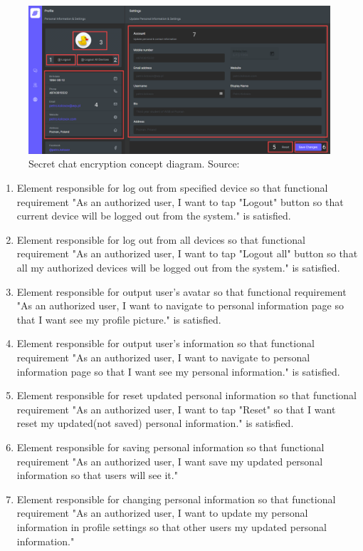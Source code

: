\begin{figure}[H]
    \centering
    \includegraphics[width=1\textwidth]{Pictures/Messenger-3}
    \caption{Secret chat encryption concept diagram. Source: }\label{fig:figure11}
\end{figure}
\begin{enumerate}
    \item Element responsible for log out from specified device so that functional requirement "As an authorized user, I want to tap
    "Logout" button so that current device will be logged out from the system." is satisfied.
    \item Element responsible for log out from all devices so that functional requirement "As an authorized user, I want to tap
    "Logout all" button so that all my authorized devices will be logged out from the system." is satisfied.
    \item Element responsible for output user's avatar so that functional requirement "As an authorized user, I want to navigate to personal information page
    so that I want see my profile picture." is satisfied.
    \item Element responsible for output user's information so that functional requirement
    "As an authorized user, I want to navigate to personal information page so that I want see my personal information." is satisfied.
    \item Element responsible for reset updated personal information so that functional requirement "As an authorized user, I want to
    tap "Reset" so that I want reset my updated(not saved) personal information." is satisfied.
    \item Element responsible for saving personal information so that functional requirement "As an authorized user, I want save my
    updated personal information so that users will see it."
    \item Element responsible for changing personal information so that functional requirement "As an authorized user, I want to
    update my personal information in profile settings so that other users my updated personal information."
\end{enumerate}